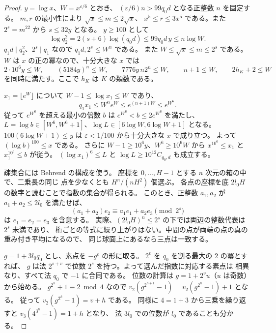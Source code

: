 \begin{proof}
\(y=\log x\)、\(W=x^{\varepsilon/6}\) とおき、
\((\varepsilon/6)n>99q_0d\) となる正整数 \(n\) を固定する。
\(m,r\) の最小性により \(\sqrt{x}\le m\le2\sqrt x\)、
\(x^5\le r\le3x^5\) である。また \(2^s=m^{22}\) から \(s\le32y\) となる。
\(y\ge100\) として
\[
 \log q_2^2=2(s+6)\log(q_0d)\le99q_0d\,y\le n\log W.
\]
\(q_1d\mid q_2^2\)、\(2^s\mid q_1\) なので \(q_1d,2^s\le W^n\) である。
また \(W\le\sqrt x\le m\le 2^s\) である。
\(W\) は \(x\) の正の冪なので、十分大きな \(x\) では
\[
 2\cdot10^6 y\le W,\qquad
 (5184y)^n\le W,\qquad 7776y\,n2^n\le W,\qquad
 n+1\le W,\qquad 2h_K+2\le W
\]
を同時に満たす。ここで \(h_K\) は \(K\) の類数である。

\(x_1=\lfloor e^W\rfloor\) について \(W-1\le\log x_1\le W\) であり、
\[
 q_1x_1\le W^n e^W\le e^{(n+1)W}\le e^{W^6}.
\]
従って \(e^{W^6}\) を超える最小の倍数 \(b\) は
\(e^{W^6}<b\le2e^{W^6}\) を満たし、
\(L=\log b\in[W^6,W^6+1]\)、\(\log L\in[6\log W,6\log W+1]\) となる。
\(100(6\log W+1)\le y\) は \(\varepsilon<1/100\) から十分大きな \(x\) で成り立つ。
よって \((\log b)^{100}\le x\) である。
さらに \(W-1\ge10^6 y\)、\(W^6\ge10^6W\) から
\(x^{10^6}\le x_1\) と \(x_1^{10^6}\le b\) が従う。
\((\log x_1)^6\le L\) と \(\log L\ge10^{12}C_{q_0,d}\) も成立する。

疎集合には Behrend の構成を使う。
座標を \(0,\ldots,H-1\) とする \(n\) 次元の箱の中で、二乗長の同じ
点を少なくとも \(H^n/(nH^2)\) 個選ぶ。
各点の座標を底 \(2l_0H\) の数字と読むことで指数の集合が得られる。
このとき、正整数 \(a_1,a_2\) が \(a_1+a_2\le2l_0\) を満たせば、
\[
 (a_1+a_2)e_2\equiv a_1 e_1+a_2 e_3 \pmod {2^s}
\]
は \(e_1=e_2=e_3\) を含意する。
実際、\((2l_0H)^n\le 2^s\) の下では両辺の整数代表は \(2^s\) 未満であり、
桁ごとの等式に繰り上がりはない。中間の点が両端の点の真の重み付き平均になるので、
同じ球面上にあるなら三点は一致する。

\(g=1+3l_0q_0\) とし、素点を \(-g^e\) の形に取る。
\(2^v\) を \(q_0\) を割る最大の \(2\) の冪とすれば、
\(g\) は法 \(2^{s+v}\) で位数 \(2^s\) を持つ。よって選んだ指数に対応する素点は
相異なり、すべて法 \(q_0\) で \(-1\) に合同である。
位数の計算は \(g=1+2^v u\)（\(u\) は奇数）から始める。
\(g^{2^h}+1\equiv2\bmod4\) なので
\(v_2(g^{2^{h+1}}-1)=v_2(g^{2^h}-1)+1\) となる。
従って \(v_2(g^{2^h}-1)=v+h\) である。
同様に \(4=1+3\) から三乗を繰り返すと \(v_3(4^{3^h}-1)=1+h\) となり、
法 \(3l_0\) での位数が \(l_0\) であることも分かる。


\end{proof}
